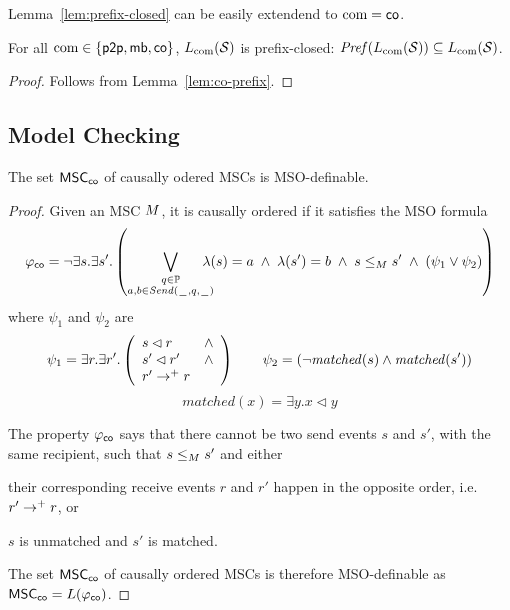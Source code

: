 \documentclass{article}
\begin{document}
Lemma~\ref{lem:prefix-closed} can be easily extendend to $\textup{com} = \mathsf{co}$.

\begin{lemma}\label{lem:co-prefix-closed}
	For all $\textup{com} \in \{\mathsf{p2p}, \mathsf{mb}, \mathsf{co}\}$, $L_{\textup{com}}(\mathcal{S})$ is prefix-closed:
	$\mathit{Pref}(L_{\textup{com}}(\mathcal{S})) \subseteq L_{\textup{com}}(\mathcal{S})$.
\end{lemma}
\begin{proof}
	Follows from Lemma~\ref{lem:co-prefix}.
\end{proof}

\subsection{Model Checking}

\begin{proposition}\label{prop:co_mso}
	The set $\mathsf{MSC}_{\mathsf{co}}$ of causally odered MSCs is MSO-definable.
\end{proposition}
\begin{proof}
	Given an MSC $M$, it is causally ordered if it satisfies the MSO formula
	\[
	\varphi_{\mathsf{co}} =
	\neg \exists s.\exists s'. \left(
	\bigvee_{\substack{q \in \mathbb{P}\\a,b \in {\mathit{Send}(\hspace{0.1em}\underline{\hspace{0.5em}}\hspace{0.1em},q,\hspace{0.1em}\underline{\hspace{0.5em}}\hspace{0.1em})}}}\hspace{-1em}
	\lambda(s) = a \;\wedge\; \lambda(s') = b
	\;\wedge\; s \le_M s' \;\wedge\;
	(\psi_1 \vee \psi_2 ) 
	\right)
	\]
	where $\psi_1$ and $\psi_2$ are
	\[
	\psi_1 = \exists r.\exists r'.\left(
	\begin{array}{ll}
		s \lhd r & \wedge\\
		s' \lhd r' & \wedge\\
		r' \to^+ r &
	\end{array} 
	\right) \quad \quad
	\psi_2 = (\neg \mathit{matched}(s) \wedge \mathit{matched}(s'))
	\]
	\[
	matched(x) = \exists y. x \lhd y
	\]

	The property $\varphi_{\mathsf{co}}$ says that there cannot be two send events $s$ and $s'$, with the same recipient, such that $s \le_M s'$ and either
	\begin{enumerate*}[label={(\roman*)}]
		\item their corresponding receive events $r$ and $r'$ happen in the opposite order, i.e. $r' \to^+ r$, or
		\item $s$ is unmatched and $s'$ is matched.
	\end{enumerate*}
	The set $\mathsf{MSC}_{\mathsf{co}}$ of causally ordered MSCs is therefore MSO-definable as $\mathsf{MSC}_{\mathsf{co}}=L(\varphi_{\mathsf{co}})$.

\end{proof}
\end{document}
